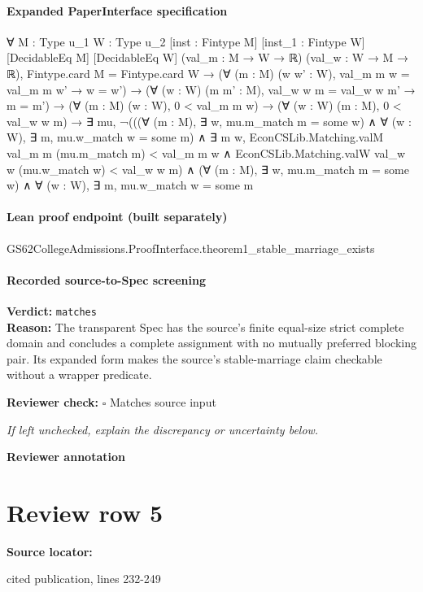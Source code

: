 \documentclass[10pt]{article}
\newcommand{\reviewerbox}{%
  \par\noindent\fbox{\parbox{0.96\linewidth}{\rule{0pt}{0.38in}}}\par
}
\newcommand{\reviewmatch}[1]{%
  \par\noindent\textbf{Reviewer check:} $\square$\; #1\par
  \noindent\emph{If left unchecked, explain the discrepancy or uncertainty below.}\par
}
\begin{document}
\paragraph{Expanded PaperInterface specification}
\begin{ReviewVerbatim}
∀ {M : Type u_1} {W : Type u_2} [inst : Fintype M] [inst_1 : Fintype W] [DecidableEq M] [DecidableEq W]
  (val_m : M → W → ℝ) (val_w : W → M → ℝ),
  Fintype.card M = Fintype.card W →
    (∀ (m : M) (w w' : W), val_m m w = val_m m w' → w = w') →
      (∀ (w : W) (m m' : M), val_w w m = val_w w m' → m = m') →
        (∀ (m : M) (w : W), 0 < val_m m w) →
          (∀ (w : W) (m : M), 0 < val_w w m) →
            ∃ mu,
              ¬(((∀ (m : M), ∃ w, mu.m_match m = some w) ∧ ∀ (w : W), ∃ m, mu.w_match w = some m) ∧
                    ∃ m w,
                      EconCSLib.Matching.valM val_m m (mu.m_match m) < val_m m w ∧
                        EconCSLib.Matching.valW val_w w (mu.w_match w) < val_w w m) ∧
                (∀ (m : M), ∃ w, mu.m_match m = some w) ∧ ∀ (w : W), ∃ m, mu.w_match w = some m
\end{ReviewVerbatim}

\paragraph{Lean proof endpoint (built separately)}\begin{ReviewVerbatim}
GS62CollegeAdmissions.ProofInterface.theorem1_stable_marriage_exists
\end{ReviewVerbatim}

\paragraph{Recorded source-to-Spec screening}
\textbf{Verdict:} \texttt{matches}
\\
\textbf{Reason:} The transparent Spec has the source's finite equal-size strict complete domain and concludes a complete assignment with no mutually preferred blocking pair. Its expanded form makes the source's stable-marriage claim checkable without a wrapper predicate.
\reviewmatch{Matches source input}
\noindent\textbf{Reviewer annotation}\par
\reviewerbox
\clearpage
\hypertarget{source-claim-5b11dd2478126734}{}
\section*{Review row 5}
\textbf{Source locator:} {\footnotesize\raggedright cited publication, lines 232-\allowbreak{}249\par}
\end{document}
